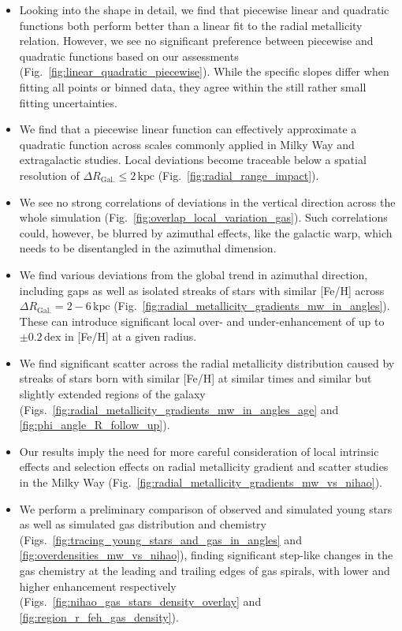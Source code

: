 \documentclass[twocolumn,apj,numberedappendix,appendixfloats,twocolappendix]{openjournal}
\begin{document}
\begin{CJK*}{UTF8}{gbsn}
\begin{itemize}
    \item Looking into the shape in detail, we find that piecewise linear and quadratic functions both perform better than a linear fit to the radial metallicity relation. However, we see no significant preference between piecewise and quadratic functions based on our assessments (Fig.~\ref{fig:linear_quadratic_piecewise}). While the specific slopes differ when fitting all points or binned data, they agree within the still rather small fitting uncertainties.
    \item We find that a piecewise linear function can effectively approximate a quadratic function across scales commonly applied in Milky Way and extragalactic studies. Local deviations become traceable below a spatial resolution of $\Delta R_\mathrm{Gal.} \leq 2\,\mathrm{kpc}$ (Fig.~\ref{fig:radial_range_impact}).
    \item We see no strong correlations of deviations in the vertical direction across the whole simulation (Fig.~\ref{fig:overlap_local_variation_gas}). Such correlations could, however, be blurred by azimuthal effects, like the galactic warp, which needs to be disentangled in the azimuthal dimension. 
    \item We find various deviations from the global trend in azimuthal direction, including gaps as well as isolated streaks of stars with similar [Fe/H] across $\Delta R_\mathrm{Gal.} = 2-6\,\mathrm{kpc}$ (Fig.~\ref{fig:radial_metallicity_gradients_mw_in_angles}). These can introduce significant local over- and under-enhancement of up to $\pm 0.2\,\mathrm{dex}$ in [Fe/H] at a given radius.
    \item We find significant scatter across the radial metallicity distribution caused by streaks of stars born with similar [Fe/H] at similar times and similar but slightly extended regions of the galaxy (Figs.~\ref{fig:radial_metallicity_gradients_mw_in_angles_age} and \ref{fig:phi_angle_R_follow_up}).
    \item Our results imply the need for more careful consideration of local intrinsic effects and selection effects on radial metallicity gradient and scatter studies in the Milky Way (Fig.~\ref{fig:radial_metallicity_gradients_mw_vs_nihao}).
    \item We perform a preliminary comparison of observed and simulated young stars as well as simulated gas distribution and chemistry (Figs.~\ref{fig:tracing_young_stars_and_gas_in_angles} and \ref{fig:overdensities_mw_vs_nihao}), finding significant step-like changes in the gas chemistry at the leading and trailing edges of gas spirals, with lower and higher enhancement respectively (Figs.~\ref{fig:nihao_gas_stars_density_overlay} and \ref{fig:region_r_feh_gas_density}).

\end{itemize}
\end{CJK*}
\end{document}
